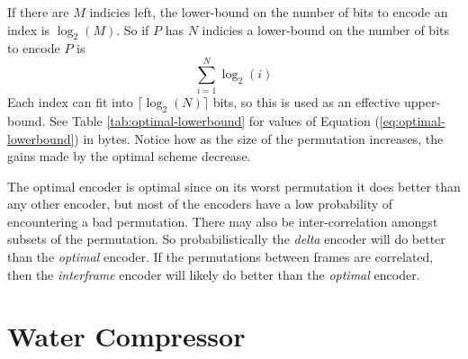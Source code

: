 \documentclass[a4paper]{report}
\begin{document}
If there are $M$ indicies left, the lower-bound on the number of bits to
encode an index is $\log_2(M)$. So if $P$ has $N$ indicies a lower-bound on
the number of bits to encode $P$ is
\begin{equation}
  \displaystyle\sum^{N}_{i=1} \log_2(i)
  \label{eq:optimal-lowerbound}
\end{equation}
Each index can fit into $\lceil\log_2(N)\rceil$ bits, so this is used as an
effective upper-bound. See Table \ref{tab:optimal-lowerbound} for values of
Equation (\ref{eq:optimal-lowerbound}) in bytes. Notice how as the size of the
permutation increases, the gains made by the optimal scheme decrease.


\begin{table}
  \center
  \caption{Number of bytes needed for storing permutations of different
    sizes. See Equation (\ref{eq:optimal-lowerbound}) for the lower bound. The
    effective upper-bound is
    $\lceil\log_2(N)\rceil/8$.} \label{tab:optimal-lowerbound}
\end{table}

The optimal encoder is optimal since on its worst permutation it does better
than any other encoder, but most of the encoders have a low probability of
encountering a bad permutation. There may also be inter-correlation amongst
subsets of the permutation. So probabilistically the \emph{delta} encoder will
do better than the \emph{optimal} encoder. If the permutations between frames
are correlated, then the \emph{interframe} encoder will likely do better than
the \emph{optimal} encoder.


\section{Water Compressor}
\end{document}
